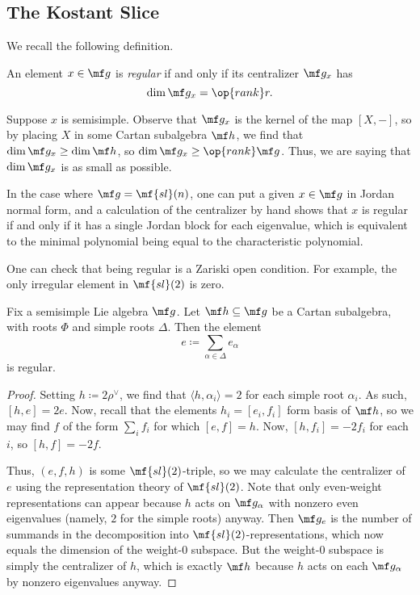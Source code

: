 \documentclass[../notes.tex]{subfiles}
\begin{document}
\subsection{The Kostant Slice}
We recall the following definition.
\begin{definition}[semisimple]
	An element $x\in\mf g$ is \textit{regular} if and only if its centralizer $\mf g_x$ has
	\[\dim\mf g_x=\op{rank}r.\]
\end{definition}
\begin{remark}
	Suppose $x$ is semisimple. Observe that $\mf g_x$ is the kernel of the map $[X,-]$, so by placing $X$ in some Cartan subalgebra $\mf h$, we find that $\dim\mf g_x\ge\dim\mf h$, so $\dim\mf g_x\ge\op{rank}\mf g$. Thus, we are saying that $\dim\mf g_x$ is as small as possible.
\end{remark}
\begin{example}
	In the case where $\mf g=\mf{sl}(n)$, one can put a given $x\in\mf g$ in Jordan normal form, and a calculation of the centralizer by hand shows that $x$ is regular if and only if it has a single Jordan block for each eigenvalue, which is equivalent to the minimal polynomial being equal to the characteristic polynomial.
\end{example}
\begin{remark}
	One can check that being regular is a Zariski open condition. For example, the only irregular element in $\mf{sl}(2)$ is zero.
\end{remark}
\begin{proposition}
	Fix a semisimple Lie algebra $\mf g$. Let $\mf h\subseteq\mf g$ be a Cartan subalgebra, with roots $\Phi$ and simple roots $\Delta$. Then the element
	\[e\coloneqq\sum_{\alpha\in\Delta}e_\alpha\]
	is regular.
\end{proposition}
\begin{proof}
	Setting $h\coloneqq2\rho^\lor$, we find that $\langle h,\alpha_i\rangle=2$ for each simple root $\alpha_i$. As such, $[h,e]=2e$. Now, recall that the elements $h_i=[e_i,f_i]$ form basis of $\mf h$, so we may find $f$ of the form $\sum_if_i$ for which $[e,f]=h$. Now, $[h,f_i]=-2f_i$ for each $i$, so $[h,f]=-2f$.

	Thus, $(e,f,h)$ is some $\mf{sl}(2)$-triple, so we may calculate the centralizer of $e$ using the representation theory of $\mf{sl}(2)$. Note that only even-weight representations can appear because $h$ acts on $\mf g_\alpha$ with nonzero even eigenvalues (namely, $2$ for the simple roots) anyway. Then $\mf g_e$ is the number of summands in the decomposition into $\mf{sl}(2)$-representations, which now equals the dimension of the weight-$0$ subspace. But the weight-$0$ subspace is simply the centralizer of $h$, which is exactly $\mf h$ because $h$ acts on each $\mf g_\alpha$ by nonzero eigenvalues anyway.
\end{proof}
\end{document}
